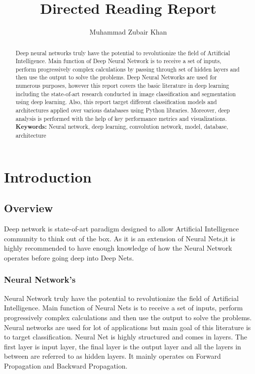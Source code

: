 \documentclass[12pt,a4paper,titlepage]{report}
\author{\Large{Muhammad Zubair Khan}}
\affil{\large{\texttt{mkzb3@mail.umkc.edu}}}
\title{\vspace{-15mm}\huge{\textbf{Directed Reading Report}}}
\begin{document}
\maketitle

\begin{abstract}
Deep neural networks truly have the potential to revolutionize the field of Artificial Intelligence. Main function of Deep Neural Network is to receive a set of inputs, perform progressively complex calculations by passing through set of hidden layers and then use the output to solve the problems. Deep Neural Networks are used for numerous purposes, however this report covers the basic literature in deep learning including the state-of-art research conducted in image classification and segmentation using deep learning. Also, this report  target different classification models and architectures applied over various databases using Python libraries. Moreover, deep analysis is performed with the help of key performance metrics and visualizations. \\

\noindent\textbf{Keywords:} Neural network, deep learning, convolution network, model, database, architecture  
\end{abstract}

\tableofcontents
\listoffigures
\listoftables

\chapter{Introduction}
\section{Overview}
Deep network is state-of-art paradigm designed to allow Artificial Intelligence community to think out of the box. As it is an extension of Neural Nets,it is highly recommended to have enough knowledge of how the Neural Network operates before going deep into Deep Nets. 

\subsection{Neural Network's}
Neural Network truly have the potential to revolutionize the field of Artificial Intelligence. Main function of Neural Nets is to receive a set of inputs, perform progressively complex calculations and then use the output to solve the problems. Neural networks are used for lot of applications but main goal of this literature is to target classification. Neural Net is highly structured and comes in layers. The first layer is input layer, the final layer is the output layer and all the layers in between are referred to as hidden layers. It mainly operates on Forward Propagation and Backward Propagation.
\end{document}
